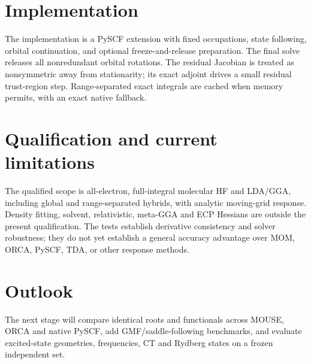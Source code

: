 \documentclass[11pt,a4paper]{article}
\begin{document}
\section{Implementation}
The implementation is a PySCF extension with fixed occupations, state
following, orbital continuation, and optional freeze-and-release preparation.
The final solve releases all nonredundant orbital rotations. The residual
Jacobian is treated as nonsymmetric away from stationarity; its exact adjoint
drives a small residual trust-region step. Range-separated exact integrals
are cached when memory permits, with an exact native fallback.



\section{Qualification and current limitations}
The qualified scope is all-electron, full-integral molecular HF and LDA/GGA,
including global and range-separated hybrids, with analytic moving-grid
response. Density fitting, solvent, relativistic, meta-GGA and ECP Hessians
are outside the present qualification. The tests establish derivative
consistency and solver robustness; they do not yet establish a general
accuracy advantage over MOM, ORCA, PySCF, TDA, or other response methods.

\section{Outlook}
The next stage will compare identical roots and functionals across MOUSE,
ORCA and native PySCF, add GMF/saddle-following benchmarks, and evaluate
excited-state geometries, frequencies, CT and Rydberg states on a frozen
independent set.



\end{document}
